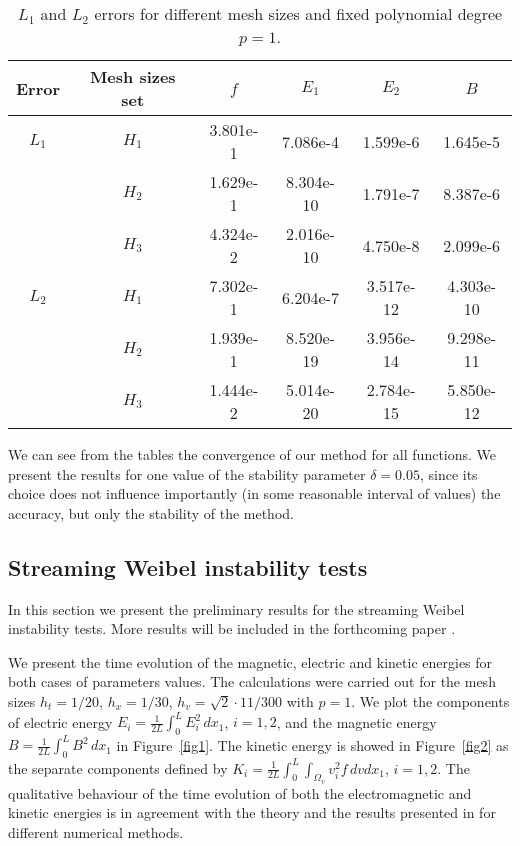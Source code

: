\documentclass[reqno,a4paper]{amsart}
\theoremstyle{remark}
\numberwithin{equation}{section}
\begin{document}
\begin{table}[!h]
\centering
\caption{$L_1$ and $L_2$ errors for different mesh sizes and fixed
polynomial degree $p=1$.}
\begin{tabular}{cccccc}
\hline
Error & Mesh sizes set & $f$ & $E_1$ & $E_2$ & $B$ \\
\hline
$L_1$ & $H_1$ & 3.801e-1 & 7.086e-4  & 1.599e-6  & 1.645e-5 \\
      & $H_2$ & 1.629e-1 & 8.304e-10 & 1.791e-7  & 8.387e-6 \\
      & $H_3$ & 4.324e-2 & 2.016e-10 & 4.750e-8  & 2.099e-6 \\
\hline
$L_2$ & $H_1$ & 7.302e-1 & 6.204e-7  & 3.517e-12 & 4.303e-10 \\
      & $H_2$ & 1.939e-1 & 8.520e-19 & 3.956e-14 & 9.298e-11 \\
      & $H_3$ & 1.444e-2 & 5.014e-20 & 2.784e-15 & 5.850e-12 \\
\hline
\end{tabular}
\label{table2}
\end{table} 

We can see from the tables the convergence of our method for all functions.
We present the results for one value of the stability parameter $\delta=0.05$,
since its choice does not influence importantly (in some reasonable interval of values)
the accuracy, but only the stability of the method.

\subsection{Streaming Weibel instability tests}

In this section we present the preliminary results
for the streaming Weibel instability tests. More results will be included
in the forthcoming paper \cite{Malmberg_Standar}.

We present the time evolution of the magnetic, electric and kinetic energies
for both cases of parameters values.
The calculations were carried out for the mesh sizes
$h_t=1/20$, $h_x=1/30$, $h_v=\sqrt{2}\cdot 11/300$ with $p=1$.
We plot the components of electric energy $E_i=\frac{1}{2L}\int_0^L E_i^2\,dx_1$,
$i=1,2$, and the magnetic energy $B=\frac{1}{2L}\int_0^L B^2\,dx_1$ in Figure~\ref{fig1}.
The kinetic energy is showed in Figure~\ref{fig2} as the separate components
defined by $K_i=\frac{1}{2L}\int_0^L\int_{\Omega_v} v_i^2 f \,dvdx_1$, $i=1,2$.
The qualitative behaviour of the time evolution of both the electromagnetic
and kinetic energies is in agreement with the theory
and the results presented in \cite{Che} for different numerical methods.
\end{document}
